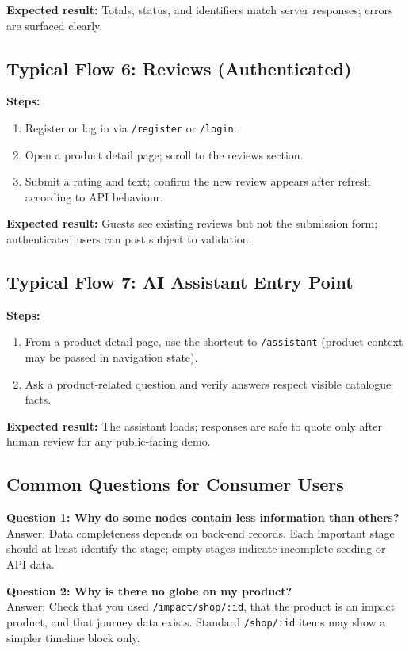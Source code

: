 \documentclass[11pt]{article}
\begin{document}
\textbf{Expected result:}
Totals, status, and identifiers match server responses; errors are surfaced clearly.

\subsection{Typical Flow 6: Reviews (Authenticated)}
\textbf{Steps:}
\begin{enumerate}[leftmargin=2.2em]
    \item Register or log in via \texttt{/register} or \texttt{/login}.
    \item Open a product detail page; scroll to the reviews section.
    \item Submit a rating and text; confirm the new review appears after refresh according to API behaviour.
\end{enumerate}

\textbf{Expected result:}
Guests see existing reviews but not the submission form; authenticated users can post subject to validation.

\subsection{Typical Flow 7: AI Assistant Entry Point}
\textbf{Steps:}
\begin{enumerate}[leftmargin=2.2em]
    \item From a product detail page, use the shortcut to \texttt{/assistant} (product context may be passed in navigation state).
    \item Ask a product-related question and verify answers respect visible catalogue facts.
\end{enumerate}

\textbf{Expected result:}
The assistant loads; responses are safe to quote only after human review for any public-facing demo.

\subsection{Common Questions for Consumer Users}
\textbf{Question 1: Why do some nodes contain less information than others?}\\
Answer: Data completeness depends on back-end records. Each important stage should at least identify the stage; empty stages indicate incomplete seeding or API data.

\textbf{Question 2: Why is there no globe on my product?}\\
Answer: Check that you used \texttt{/impact/shop/:id}, that the product is an impact product, and that journey data exists. Standard \texttt{/shop/:id} items may show a simpler timeline block only.
\end{document}
